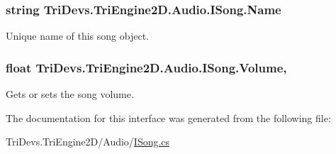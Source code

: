 \hypertarget{interface_tri_devs_1_1_tri_engine2_d_1_1_audio_1_1_i_song_ad14836f818a4e0d63c9a341c2159250a}{
\subsubsection[{Name}]{\setlength{\rightskip}{0pt plus 5cm}string Tri\-Devs.\-Tri\-Engine2\-D.\-Audio.\-I\-Song.\-Name\hspace{0.3cm}{\ttfamily [get]}}}\label{interface_tri_devs_1_1_tri_engine2_d_1_1_audio_1_1_i_song_ad14836f818a4e0d63c9a341c2159250a}


Unique name of this song object. 

\hypertarget{interface_tri_devs_1_1_tri_engine2_d_1_1_audio_1_1_i_song_aaf0addd47d248155a74d9cb9eca8fa4b}{
\subsubsection[{Volume}]{\setlength{\rightskip}{0pt plus 5cm}float Tri\-Devs.\-Tri\-Engine2\-D.\-Audio.\-I\-Song.\-Volume\hspace{0.3cm}{\ttfamily [get]}, {\ttfamily [set]}}}\label{interface_tri_devs_1_1_tri_engine2_d_1_1_audio_1_1_i_song_aaf0addd47d248155a74d9cb9eca8fa4b}


Gets or sets the song volume. 



The documentation for this interface was generated from the following file\-:\begin{DoxyCompactItemize}
\item 
Tri\-Devs.\-Tri\-Engine2\-D/\-Audio/\hyperlink{_i_song_8cs}{I\-Song.\-cs}\end{DoxyCompactItemize}
